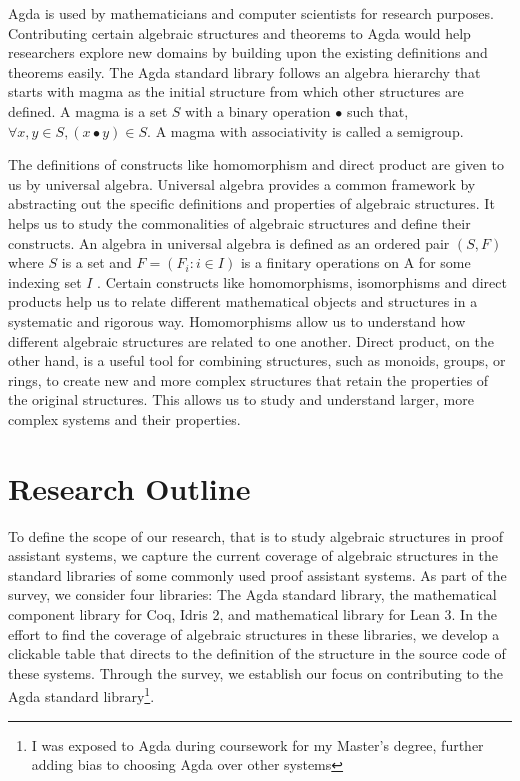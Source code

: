 Agda is used by mathematicians and computer scientists for research purposes.
Contributing certain algebraic structures and theorems to Agda would help
researchers explore new domains by building upon the existing definitions and
theorems easily. The Agda standard library follows an algebra hierarchy that
starts with magma as the initial structure from which other structures are
defined. A magma is a set $S$ with a binary operation $∙$ such that, $\forall
x,y \in S, (x ∙ y) \in S$. A magma with associativity is called a semigroup.

The definitions of constructs like homomorphism and direct product are given to
us by universal algebra. Universal algebra provides a common framework by
abstracting out the specific definitions and properties of algebraic structures.
It helps us to study the commonalities of algebraic structures and define their
constructs. An algebra in universal algebra is defined as an ordered pair
$(S,F)$ where $S$ is a set and $F = (F_i:i\in I)$ is a finitary operations on A
for some indexing set $I$ \cite{sannella2012foundations}. Certain constructs
like homomorphisms, isomorphisms and direct products help us to relate different
mathematical objects and structures in a systematic and rigorous way.
Homomorphisms allow us to understand how different algebraic structures are
related to one another. Direct product, on the other hand, is a useful tool for
combining structures, such as monoids, groups, or rings, to create new and more
complex structures that retain the properties of the original structures. This
allows us to study and understand larger, more complex systems and their
properties.

\section{Research Outline}
To define the scope of our research, that is to study algebraic structures in
proof assistant systems, we capture the current coverage of algebraic structures
in the standard libraries of some commonly used proof assistant systems. As part
of the survey, we consider four libraries: The Agda standard library, the
mathematical component library for Coq, Idris 2, and mathematical library for
Lean 3. In the effort to find the coverage of algebraic structures in these
libraries, we develop a clickable table that directs to the definition of the
structure in the source code of these systems. Through the survey, we establish
our focus on contributing to the Agda standard library\footnote{I was exposed to
Agda during coursework for my Master's degree, further adding bias to choosing
Agda over other systems}.

